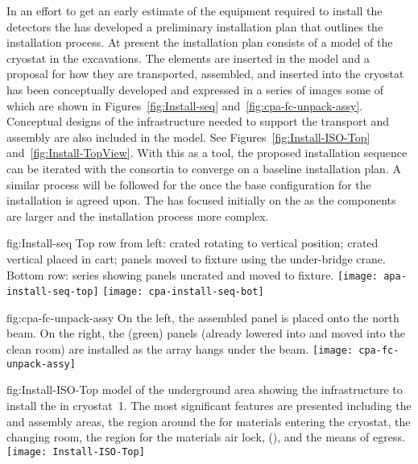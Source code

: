 In an effort to get an early estimate of the equipment required to
install the detectors the  has developed a preliminary
installation plan that outlines the installation process. At present
the installation plan consists of a \threed model of the cryostat in the
excavations. The  elements are inserted in the
model and a proposal for how they are transported, assembled, and
inserted into the cryostat has been conceptually developed and expressed in a series of images
some of which are shown in Figures~\ref{fig:Install-seq} and~\ref{fig:cpa-fc-unpack-assy}. 
%
Conceptual designs of the infrastructure needed to support
the transport and assembly are also included in the model. See Figures~\ref{fig:Install-ISO-Top} and~\ref{fig:Install-TopView}. With this
as a tool, the proposed installation sequence can be iterated with the
consortia to converge on a baseline installation plan. A similar
process will be followed for the  once the base
configuration for the  installation is agreed upon. The
 has focused initially on the  as the
 components are larger and the installation process more
complex. 

\begin{dunefigure}{fig:Install-seq}
  {Top row from left:  crated  rotating to vertical position;  crated vertical  placed in cart;  panels moved to fixture using the under-bridge crane. Bottom row: series showing  panels uncrated and moved to fixture. }
\texttt{[image: apa-install-seq-top]}
\texttt{[image: cpa-install-seq-bot]}
\end{dunefigure}

\begin{dunefigure}{fig:cpa-fc-unpack-assy}
  {On the left, the assembled  panel is placed onto the north  beam. On the right, the (green)  panels (already lowered into  and moved into the clean room) are installed as the  array hangs under the  beam. }
\texttt{[image: cpa-fc-unpack-assy]}
\end{dunefigure}

\begin{dunefigure}{fig:Install-ISO-Top}
  {\threed model of the underground area showing the infrastructure to install the  in cryostat~1. The most significant features are presented including the  and  assembly areas, the region around the  for materials entering the cryostat,  the changing room, the region for the materials air lock, (), 
  and the means of egress.}
\texttt{[image: Install-ISO-Top]}
\end{dunefigure}

